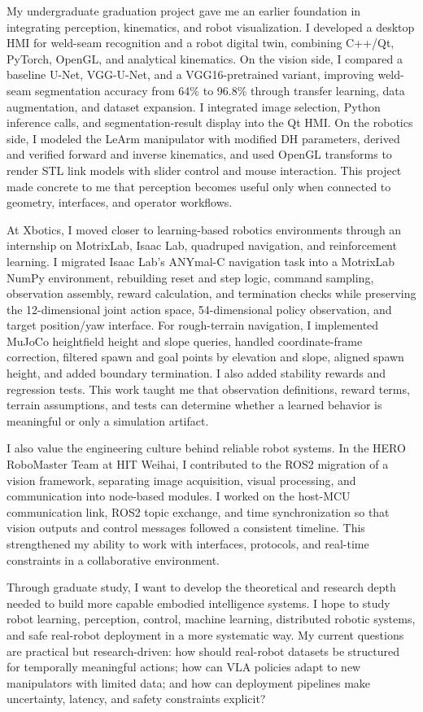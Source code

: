 My undergraduate graduation project gave me an earlier foundation in integrating perception, kinematics, and robot visualization. I developed a desktop HMI for weld-seam recognition and a robot digital twin, combining C++/Qt, PyTorch, OpenGL, and analytical kinematics. On the vision side, I compared a baseline U-Net, VGG-U-Net, and a VGG16-pretrained variant, improving weld-seam segmentation accuracy from 64\% to 96.8\% through transfer learning, data augmentation, and dataset expansion. I integrated image selection, Python inference calls, and segmentation-result display into the Qt HMI. On the robotics side, I modeled the LeArm manipulator with modified DH parameters, derived and verified forward and inverse kinematics, and used OpenGL transforms to render STL link models with slider control and mouse interaction. This project made concrete to me that perception becomes useful only when connected to geometry, interfaces, and operator workflows.

At Xbotics, I moved closer to learning-based robotics environments through an internship on MotrixLab, Isaac Lab, quadruped navigation, and reinforcement learning. I migrated Isaac Lab's ANYmal-C navigation task into a MotrixLab NumPy environment, rebuilding reset and step logic, command sampling, observation assembly, reward calculation, and termination checks while preserving the 12-dimensional joint action space, 54-dimensional policy observation, and target position/yaw interface. For rough-terrain navigation, I implemented MuJoCo heightfield height and slope queries, handled coordinate-frame correction, filtered spawn and goal points by elevation and slope, aligned spawn height, and added boundary termination. I also added stability rewards and regression tests. This work taught me that observation definitions, reward terms, terrain assumptions, and tests can determine whether a learned behavior is meaningful or only a simulation artifact.

I also value the engineering culture behind reliable robot systems. In the HERO RoboMaster Team at HIT Weihai, I contributed to the ROS2 migration of a vision framework, separating image acquisition, visual processing, and communication into node-based modules. I worked on the host-MCU communication link, ROS2 topic exchange, and time synchronization so that vision outputs and control messages followed a consistent timeline. This strengthened my ability to work with interfaces, protocols, and real-time constraints in a collaborative environment.

Through graduate study, I want to develop the theoretical and research depth needed to build more capable embodied intelligence systems. I hope to study robot learning, perception, control, machine learning, distributed robotic systems, and safe real-robot deployment in a more systematic way. My current questions are practical but research-driven: how should real-robot datasets be structured for temporally meaningful actions; how can VLA policies adapt to new manipulators with limited data; and how can deployment pipelines make uncertainty, latency, and safety constraints explicit?
